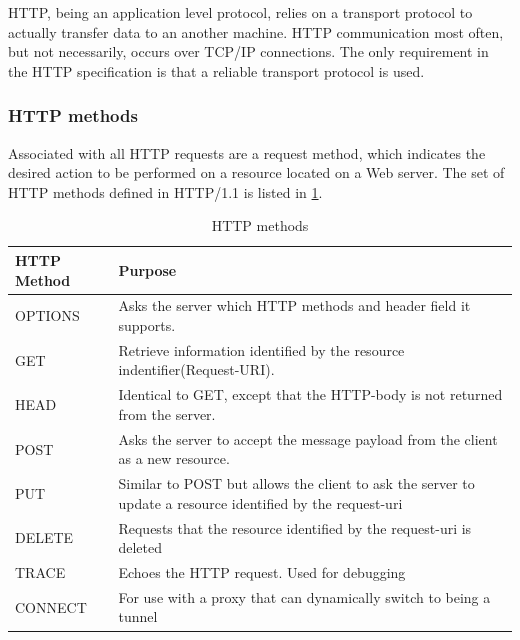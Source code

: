 HTTP, being an application level protocol, relies on a transport protocol to
actually transfer data to an another machine. HTTP communication most often, but
not necessarily, occurs over TCP/IP connections. The only requirement in the HTTP
specification is that a reliable transport protocol is used.

\subsubsection{HTTP methods}

 Associated with all HTTP requests are a request method, which indicates the
 desired action to be performed on a resource located on a Web server. The set
 of HTTP methods defined in HTTP/1.1 is listed in \cref{table-http-methods}.

 \begin{table}[h]
 \begin{tabularx}{\textwidth}{| X | X |}
 \hline
   \textbf{HTTP Method} & \textbf{Purpose} \\ \hline
   OPTIONS & Asks the server which HTTP methods and header field it supports. \\ \hline
   GET & Retrieve information identified by the resource indentifier(Request-URI). \\ \hline
   HEAD & Identical to GET, except that the HTTP-body is not returned from the server. \\ \hline
   POST & Asks the server to accept the message payload from the client as a new resource.\\ \hline
   PUT & Similar to POST but allows the client to ask the server to update a resource identified by the request-uri \\ \hline
   DELETE & Requests that the resource identified by the request-uri is deleted \\ \hline
   TRACE & Echoes the HTTP request. Used for debugging \\ \hline
   CONNECT & For use with a proxy that can dynamically switch to being a tunnel\\ \hline
 \end{tabularx}
 \caption{HTTP methods}
 \label{table-http-methods}
 \end{table}

\section{}
\label{tcp}

